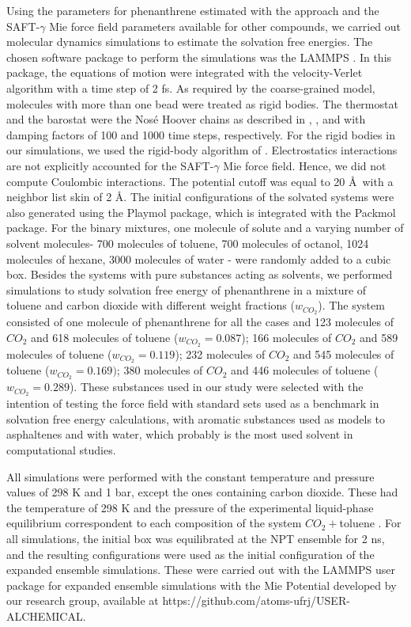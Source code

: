 Using the parameters for phenanthrene estimated with the  approach and the SAFT-$\gamma$ Mie force field parameters available for other compounds, we carried out molecular dynamics simulations to estimate the solvation free energies. The chosen software package to perform the simulations was the LAMMPS  \cite{lammps}. In this package, the equations of motion were integrated with the velocity-Verlet algorithm \cite{verlet} with a time step of 2 fs. As required by the coarse-grained model,  molecules with more than one bead were treated as rigid bodies. The thermostat and the barostat were the Nos\'{e} Hoover chains as described in , , and  with damping factors of 100 and 1000 time steps, respectively. For the rigid bodies in our simulations, we used the rigid-body algorithm of . Electrostatics interactions are not explicitly accounted for the SAFT-$\gamma$ Mie force field. Hence, we did not compute Coulombic interactions. The potential cutoff was equal to 20 \AA $\,$ \cite{muller2017} with a neighbor list skin of 2 \AA. The initial configurations of the solvated systems were also generated using the Playmol package, which is integrated with the Packmol package. For the binary mixtures, one molecule of solute and a varying number of solvent molecules- 700 molecules of toluene, 700 molecules of octanol, 1024 molecules of hexane, 3000 molecules of water - were randomly added to a cubic box. Besides the systems with pure substances acting as solvents, we performed simulations to study solvation free energy of phenanthrene in a mixture of toluene and carbon dioxide with different weight fractions ($w_{CO_{2}}$). The  system consisted of one molecule of phenanthrene for all the cases and 123 molecules of $CO_{2}$ and 618 molecules of toluene ($w_{CO_{2}} = 0.087$); 166 molecules of $CO_{2}$ and 589 molecules of toluene ($w_{CO_{2}} = 0.119$); 232 molecules of $CO_{2}$ and 545 molecules of toluene ($w_{CO_{2}} = 0.169)$; 380 molecules of $CO_{2}$ and 446 molecules of toluene ($w_{CO_{2}} = 0.289$). These substances used in our study were selected with the intention of testing the force field with standard sets used as a benchmark in solvation free energy calculations, with aromatic substances used as models to asphaltenes and with water, which probably is the most used solvent in computational studies.

All simulations were performed with the constant temperature and pressure values of 298 K and 1 bar, except the ones containing carbon dioxide. These had the temperature of 298 K and the pressure of the experimental liquid-phase equilibrium correspondent to each composition of the system $CO_{2}+$toluene \cite{co2toliq}. For all simulations, the initial box was equilibrated at the NPT ensemble for 2 ns, and the resulting configurations were used as the initial configuration of the expanded ensemble simulations. These were carried out with the LAMMPS user package for expanded ensemble simulations with the Mie Potential developed by our research group, available at https://github.com/atoms-ufrj/USER-ALCHEMICAL. 

